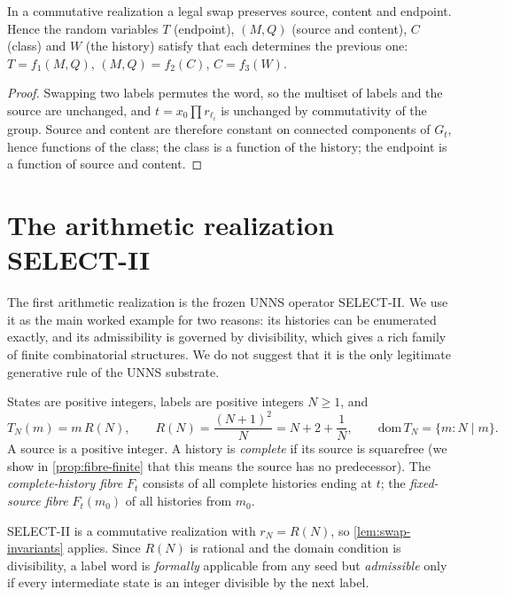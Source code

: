\begin{lemma}\label{lem:swap-invariants}
In a commutative realization a legal swap preserves source, content and endpoint. Hence the random variables $T$ (endpoint), $(M,Q)$ (source and content), $C$ (class) and $W$ (the history) satisfy that each determines the previous one: $T=f_1(M,Q)$, $(M,Q)=f_2(C)$, $C=f_3(W)$.
\end{lemma}
\begin{proof}
Swapping two labels permutes the word, so the multiset of labels and the source are unchanged, and $t=x_0\prod r_{\ell_i}$ is unchanged by commutativity of the group. Source and content are therefore constant on connected components of $G_t$, hence functions of the class; the class is a function of the history; the endpoint is a function of source and content.
\end{proof}

\section{The arithmetic realization SELECT-II}\label{sec:selectII}
The first arithmetic realization is the frozen UNNS operator SELECT-II. We use it as the main worked example for two reasons: its histories can be enumerated exactly, and its admissibility is governed by divisibility, which gives a rich family of finite combinatorial structures. We do not suggest that it is the only legitimate generative rule of the UNNS substrate.

\begin{definition}[SELECT-II]\label{def:selectII}
States are positive integers, labels are positive integers $N\ge1$, and
\begin{equation}\label{eq:selectII}
T_N(m)=m\,R(N),\qquad R(N)=\frac{(N+1)^2}{N}=N+2+\frac1N,\qquad \mathrm{dom}\,T_N=\{m: N\mid m\}.
\end{equation}
A source is a positive integer. A history is \emph{complete} if its source is squarefree (we show in \cref{prop:fibre-finite} that this means the source has no predecessor). The \emph{complete-history fibre} $F_t$ consists of all complete histories ending at $t$; the \emph{fixed-source fibre} $F_t(m_0)$ of all histories from $m_0$.
\end{definition}
SELECT-II is a commutative realization with $r_N=R(N)$, so \cref{lem:swap-invariants} applies. Since $R(N)$ is rational and the domain condition is divisibility, a label word is \emph{formally} applicable from any seed but \emph{admissible} only if every intermediate state is an integer divisible by the next label.

